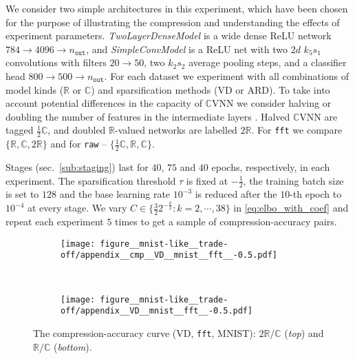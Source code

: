 \documentclass{article}
\newcommand{\real}{\mathbb{R}}
\newcommand{\cplx}{\mathbb{C}}
\begin{document}
We consider two simple architectures in this experiment, which have been chosen for
the purpose of illustrating the compression and understanding the effects of experiment
parameters. \emph{TwoLayerDenseModel} is a wide dense ReLU network $
  784 \to 4096 \to n_\mathtt{out}
$, and \emph{SimpleConvModel} is a ReLU net with two $2d$ $k_5 s_1$ convolutions with
filters $20 \to 50$, two $k_2 s_2$ average pooling steps, and a classifier head
$800 \to 500 \to n_\mathtt{out}$.
%
For each dataset we experiment with all combinations of model kinds ($\real$ or $\cplx$)
and sparsification methods (VD or ARD). To take into account potential differences in
the capacity of $\cplx$VNN we consider halving or doubling the number of features in
the intermediate layers \citep{monning_evaluation_2018}. Halved $\cplx$VNN are tagged
$\tfrac12\cplx$, and doubled $\real$-valued networks are labelled $2\real$. For \texttt{fft}
we compare $\{\real, \cplx, 2\real\}$ and for \texttt{raw} -- $\{\tfrac12\cplx, \real, \cplx\}$.

Stages (sec.~\ref{sub:staging}) last for $40$, $75$ and $40$ epochs, respectively, in each
experiment. The sparsification threshold $\tau$ is fixed at $-\tfrac12$, the training batch
size is set to $128$ and the base learning rate ${10}^{-3}$ is reduced after the $10$-th
epoch to ${10}^{-4}$ at every stage.
%
We vary $
  C \in \{
    \tfrac32 2^{-\tfrac{k}2} \colon k=2, \cdots, 38
  \}
$ in \eqref{eq:elbo_with_coef} and repeat each experiment $5$ times to get a sample
of compression-accuracy pairs.

\begin{figure}[!t]
  \centering
  \begin{subfigure}  %
    \centering
    \texttt{[image: figure\_\_mnist-like\_\_trade-off/appendix\_\_cmp\_\_VD\_\_mnist\_\_fft\_\_-0.5.pdf]}
  \end{subfigure} \\%
  \begin{subfigure}  %
    \centering
    \texttt{[image: figure\_\_mnist-like\_\_trade-off/appendix\_\_VD\_\_mnist\_\_fft\_\_-0.5.pdf]}
  \end{subfigure}
  \caption{%
    The compression-accuracy curve (VD, \texttt{fft}, MNIST):
    $2 \real / \cplx$ (\textit{top}) and $\real / \cplx$ (\textit{bottom}).
  }
  \label{fig:mnist-like__trade-off__fft}
\end{figure}
\end{document}

